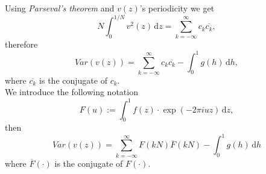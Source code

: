 Using \textit{Parseval's theorem} and $v(z)$'s periodicity we get
\begin{equation*}
    N \int_0^{1/N} v^2(z) \,\mathrm{d}z = \sum_{k=-\infty}^{\infty} c_k \overline{c_k},
\end{equation*}
therefore
\begin{equation*}
    Var(v(z)) = \sum_{k=-\infty}^{\infty} c_k \overline{c_k} - \int_{0}^{1} g(h) \,\mathrm{d}h,
\end{equation*}
where $\overline{c_k}$ is the conjugate of $c_k$.\\

We introduce the following notation
\begin{equation*}
    F(u) := \int_{0}^{1} f(z) \cdot \exp{(-2\pi i u z)} \,\mathrm{d}z,
\end{equation*}
then
\begin{equation*}
    Var(v(z)) = \sum_{k=-\infty}^{\infty} F\left( k N \right) \overline{F}\left( k N \right) - \int_{0}^{1} g(h) \,\mathrm{d}h
\end{equation*}
where $\overline{F}(\cdot)$ is the conjugate of $F(\cdot)$.\\

